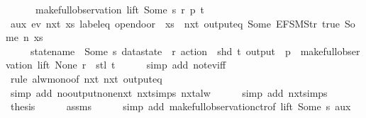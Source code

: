 \begin{isabellebody}
\ \ \ \ \ \ {\isacharparenleft}make{\isacharunderscore}full{\isacharunderscore}observation\ lift\ {\isacharparenleft}Some\ s{\isacharparenright}\ r\ p\ t{\isacharparenright}{\isachardoublequoteclose}\isanewline
%
\isadelimproof
%
\endisadelimproof
%
\isatagproof
{}\isamarkupfalse%
{\isacharminus}\isanewline
\ \ \isamarkupfalse%
\ aux{\isacharcolon}\ {\isachardoublequoteopen}{\isasymnot}ev\ {\isacharparenleft}nxt\ {\isacharparenleft}{\isasymlambda}xs{\isachardot}\ label{\isacharunderscore}eq\ {\isacharprime}{\isacharprime}opendoor\ {\isacharprime}{\isacharprime}\ xs\ {\isasymand}\ nxt\ {\isacharparenleft}output{\isacharunderscore}eq\ {\isacharbrackleft}Some\ {\isacharparenleft}EFSM{\isachardot}Str\ {\isacharprime}{\isacharprime}true{\isacharprime}{\isacharprime}{\isacharparenright}{\isacharcomma}\ Some\ n{\isacharbrackright}{\isacharparenright}\ xs{\isacharparenright}{\isacharparenright}\isanewline
\ \ \ \ \ {\isacharparenleft}{\isasymlparr}statename\ {\isacharequal}\ Some\ s{\isacharcomma}\ datastate\ {\isacharequal}\ r{\isacharcomma}\ action\ {\isacharequal}\ shd\ t{\isacharcomma}\ output\ {\isacharequal}\ p{\isasymrparr}\ {\isacharhash}{\isacharhash}\ make{\isacharunderscore}full{\isacharunderscore}observation\ lift\ None\ r\ {\isacharbrackleft}{\isacharbrackright}\ {\isacharparenleft}stl\ t{\isacharparenright}{\isacharparenright}{\isachardoublequoteclose}\isanewline
\ \ \ \ \isamarkupfalse%
\ {\isacharparenleft}simp\ add{\isacharcolon}\ not{\isacharunderscore}ev{\isacharunderscore}iff{\isacharparenright}\isanewline
\ \ \ \ \isamarkupfalse%
\ {\isacharparenleft}rule\ alw{\isacharunderscore}mono{\isacharbrackleft}of\ {\isachardoublequoteopen}nxt\ {\isacharparenleft}nxt\ {\isacharparenleft}output{\isacharunderscore}eq\ {\isacharbrackleft}{\isacharbrackright}{\isacharparenright}{\isacharparenright}{\isachardoublequoteclose}{\isacharbrackright}{\isacharparenright}\isanewline
\ \ \ \ \ \isamarkupfalse%
\ {\isacharparenleft}simp\ add{\isacharcolon}\ no{\isacharunderscore}output{\isacharunderscore}none{\isacharunderscore}nxt\ nxt{\isachardot}simps\ nxt{\isacharunderscore}alw{\isacharparenright}\isanewline
\ \ \ \ \isamarkupfalse%
\ {\isacharparenleft}simp\ add{\isacharcolon}\ nxt{\isachardot}simps{\isacharparenright}\isanewline
\ \ \isamarkupfalse%
\ {\isacharquery}thesis\isanewline
\ \ \ \ \isamarkupfalse%
\ assms\isanewline
\ \ \ \ \isamarkupfalse%
\ {\isacharparenleft}simp\ add{\isacharcolon}\ make{\isacharunderscore}full{\isacharunderscore}observation{\isachardot}ctr{\isacharbrackleft}of\ lift\ {\isachardoublequoteopen}Some\ s{\isachardoublequoteclose}{\isacharbrackright}\ aux{\isacharparenright}\isanewline

\end{isabellebody}
